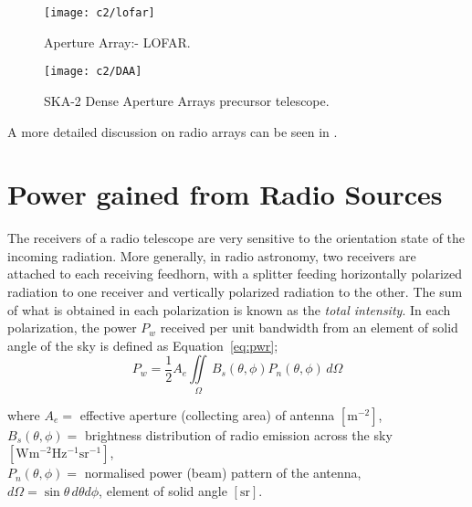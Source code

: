 %
\begin{figure}[ht]
    \centering	    
    \texttt{[image: c2/lofar]}
    \caption{Aperture Array:- LOFAR.}
    \label{fig:lofar}
\end{figure}
  \FloatBarrier 
%
%
\begin{figure}[ht]
    \centering	    
    \texttt{[image: c2/DAA]}
    \caption{SKA-2 Dense Aperture Arrays precursor telescope.}
    \label{fig:daa}
\end{figure}
  \FloatBarrier 
A more detailed discussion on radio arrays can be seen in \cite{techreport-minimal3}.
%

 
  \section{Power gained from Radio Sources}	   \label{chap2:sec5a0}
  
The receivers of a radio telescope are very sensitive to the orientation state of the incoming radiation. More generally, in radio astronomy, two receivers are 
attached to each receiving feedhorn, with a splitter feeding horizontally polarized radiation to one receiver
and vertically polarized radiation to the other. The sum of what is obtained in each polarization is known as the \emph{total intensity}. In each polarization, 
the power $P_{w}$ received per unit bandwidth from an element of solid angle of the sky is defined as Equation~\ref{eq:pwr};
\begin{equation} \label{eq:pwr}
P_{w} = \frac{1}{2}A_{e}\iint\limits_{\varOmega}\, B_{s}(\theta,\phi)P_{n}(\theta,\phi)\, d\varOmega 
\end{equation}

\noindent where $A_{e} = $ effective aperture (collecting area) of antenna $\mathrm{[m^{-2}]}$,\\
$B_{s}(\theta,\phi) = $ brightness distribution of radio emission across the sky $\mathrm{[Wm^{-2}Hz^{-1}sr^{-1}]}$,\\
$P_{n}(\theta,\phi) =$ normalised power (beam) pattern of the antenna,\\
$d\varOmega = \sin\theta\, d\theta d\phi$, element of solid angle $\mathrm{[sr]}$.

